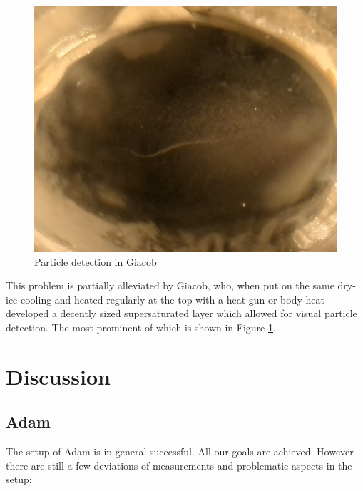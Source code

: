 \documentclass[10pt,a4paper]{article}
\begin{document}
\begin{figure}
    \vspace{-\baselineskip}
    \includegraphics[width=1\linewidth]{images/giacob particle.png}
    \caption{Particle detection in Giacob}
    \label{fig:particle-giacob}
\end{figure}

This problem is partially alleviated by Giacob, who, when put on the same dry-ice cooling and heated regularly at the top with a heat-gun or body heat developed a decently sized supersaturated layer which allowed for visual particle detection. The most prominent of which is shown in Figure \ref{fig:particle-giacob}.



\section{Discussion}

\subsection{Adam}

The setup of Adam is in general successful. All our goals are achieved. However there are still a few deviations of measurements and problematic aspects in the setup:
\end{document}
